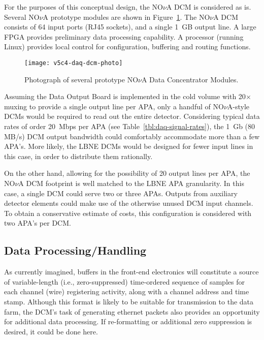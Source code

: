 For the purposes of this conceptual design, the NO$\nu$A DCM 
is considered as is.  Several NO$\nu$A prototype modules are shown in 
Figure~\ref{fig:daq-dcm-photo}.  The NO$\nu$A DCM consists of 64 input 
ports (RJ45 sockets), and a single 1~GB output line.  A large 
FPGA provides preliminary data processing capability.  A processor (running 
Linux) provides local control for configuration, buffering and routing 
functions.
%
\begin{figure}[htbp]
\centering
\texttt{[image: v5c4-daq-dcm-photo]}
\caption{Photograph of several prototype NO$\nu$A Data Concentrator Modules.}
\label{fig:daq-dcm-photo}
\end{figure}


Assuming the Data Output Board is implemented in the cold volume with 
20$\times$ muxing to provide a single output line per APA, only a handful 
of NO$\nu$A-style DCMs would be required to read out the entire detector.  
Considering typical data rates of order 20~Mbps per APA 
(see Table~\ref{tbl:daq-signal-rates}), the 1~Gb (80 MB/s) 
DCM output bandwidth 
could comfortably accommodate more than a few APA's.
More likely, the LBNE DCMs would be designed for fewer input lines 
in this case, in order to distribute them rationally. 

On the other hand, allowing for the possibility of 20 output lines per APA, 
the NO$\nu$A DCM footprint is well matched to the LBNE APA granularity.  In 
this case, a single DCM could serve two or three APAs.  Outputs from auxiliary 
detector elements could make use of the otherwise unused DCM input channels.
To obtain a conservative estimate of costs, this configuration is considered 
with two APA's per DCM.


\subsection{Data Processing/Handling}

As currently imagined, buffers in the front-end electronics will constitute  
a source of variable-length (i.e., zero-suppressed) time-ordered sequence 
of samples for each channel (wire) registering activity, along with a 
channel address and time stamp.  Although this format is likely to be 
suitable for transmission to the data farm, the DCM's task of generating 
ethernet packets also provides an opportunity for additional data processing.  
If re-formatting or additional zero suppression is desired, 
it could be done here.   


